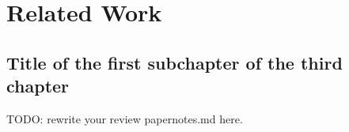 \chapter{Related Work}
\label{related_work}

\section{Title of the first subchapter of the third chapter}
TODO: rewrite your review papernotes.md here.

